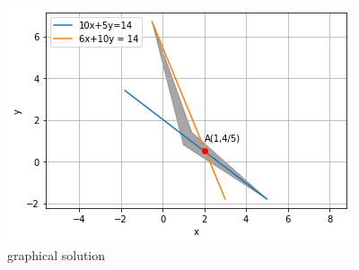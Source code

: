 \documentclass[journal,12pt,twocolumn]{IEEEtran}
\begin{document}
\begin{figure}[!ht]
\centering
\includegraphics[width=\columnwidth]{Optimization.png}
\caption{graphical solution}
\label{fig: Optimization graphical solution}	
\end{figure}
\end{document}
